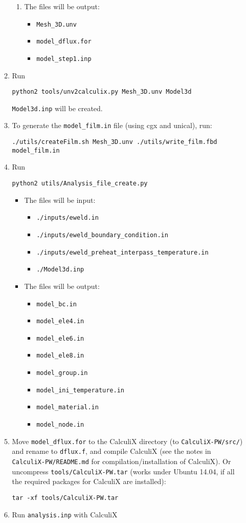 \documentclass[12pt,letterpaper]{article}
\newcommand{\verbStyle}[1]{{\color{SteelBlue40}\colorbox{LightSteelBlue10}{{#1}}}}
\let\OldTexttt\texttt
\renewcommand{\texttt}[1]{\OldTexttt{\verbStyle{#1}}}
\begin{document}
\begin{itemize}
\begin{enumerate}
\begin{enumerate}
\item The files will be output: 
\begin{itemize}
\item \texttt{Mesh\_3D.unv}
\item \texttt{model\_dflux.for}
\item \texttt{model\_step1.inp}
\end{itemize}
\end{enumerate}
\item Run 
\begin{verbatim}
python2 tools/unv2calculix.py Mesh_3D.unv Model3d
\end{verbatim}
\texttt{Model3d.inp} will be created.
\item To generate the \texttt{model\_film.in} file (using cgx and unical), run:
\begin{verbatim}
./utils/createFilm.sh Mesh_3D.unv ./utils/write_film.fbd model_film.in
\end{verbatim}
\item Run 
\begin{verbatim}
python2 utils/Analysis_file_create.py
\end{verbatim}
\begin{itemize}
\item The files will be input:
\begin{itemize}
\item \texttt{./inputs/eweld.in}
\item \texttt{./inputs/eweld\_boundary\_condition.in}
\item \texttt{./inputs/eweld\_preheat\_interpass\_temperature.in}
\item \texttt{./Model3d.inp}
\end{itemize}
\item The files will be output:
\begin{itemize}
\item \texttt{model\_bc.in}
\item \texttt{model\_ele4.in}
\item \texttt{model\_ele6.in}
\item \texttt{model\_ele8.in}
\item \texttt{model\_group.in}
\item \texttt{model\_ini\_temperature.in}
\item \texttt{model\_material.in}
\item \texttt{model\_node.in}
\end{itemize}
\end{itemize}
\item Move \texttt{model\_dflux.for} to the CalculiX directory (to \texttt{CalculiX-PW/src/}) and rename to \texttt{dflux.f}, and compile CalculiX
(see the notes in \texttt{CalculiX-PW/README.md} for compilation/installation of CalculiX).
Or uncompress \texttt{tools/CalculiX-PW.tar} (works under Ubuntu 14.04, if all the required packages for CalculiX are installed):
\begin{verbatim}
tar -xf tools/CalculiX-PW.tar
\end{verbatim}
\item Run \texttt{analysis.inp} with CalculiX
\end{enumerate}
\end{itemize}
\end{document}
